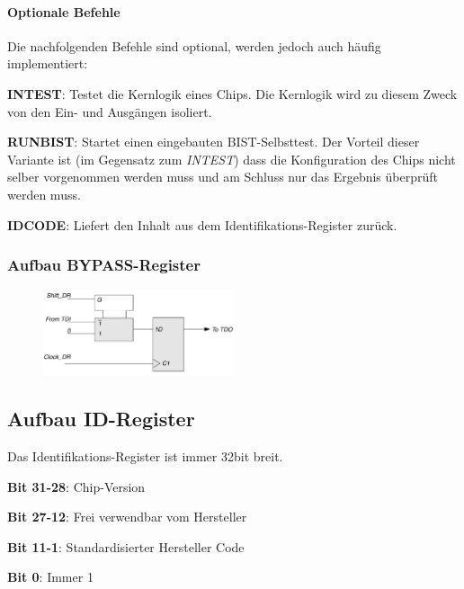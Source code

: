 \paragraph{Optionale Befehle}
Die nachfolgenden Befehle sind optional, werden jedoch auch häufig implementiert:
\begin{compactitem}
    \item \textbf{INTEST}: Testet die Kernlogik eines Chips. Die Kernlogik wird zu diesem Zweck von den Ein- und Ausgängen isoliert.
    \item \textbf{RUNBIST}: Startet einen eingebauten BIST-Selbsttest. Der Vorteil dieser Variante ist (im Gegensatz zum \textit{INTEST}) dass die Konfiguration des Chips nicht selber vorgenommen werden muss und am Schluss nur das Ergebnis überprüft werden muss.
    \item \textbf{IDCODE}: Liefert den Inhalt aus dem Identifikations-Register zurück.
\end{compactitem}
\begin{multicols}{2}
\subsubsection{Aufbau BYPASS-Register}
\begin{figure}[H]
    \includegraphics[width=0.5\textwidth]{images/bst_bypassregister.png}
\end{figure}

\subsection{Aufbau ID-Register}
Das Identifikations-Register ist immer 32bit breit.
\begin{compactitem}
    \item \textbf{Bit 31-28}: Chip-Version
    \item \textbf{Bit 27-12}: Frei verwendbar vom Hersteller
    \item \textbf{Bit 11-1}: Standardisierter Hersteller Code
    \item \textbf{Bit 0}: Immer 1
\end{compactitem}
\end{multicols}
